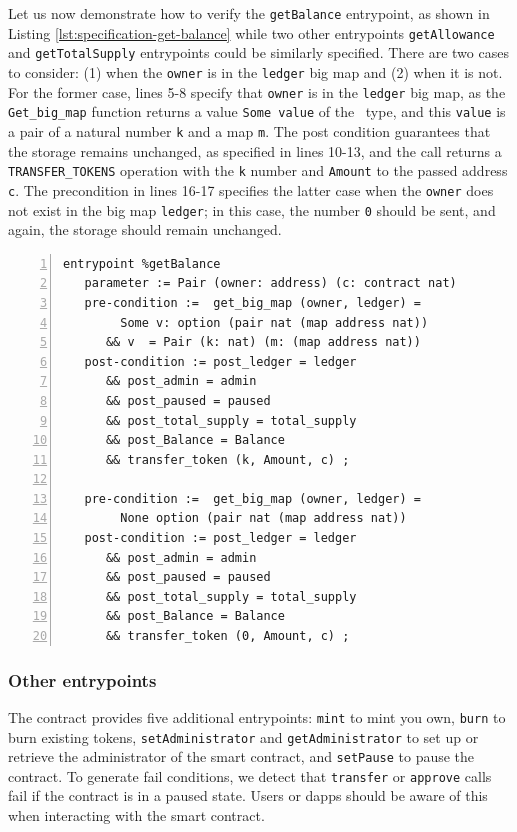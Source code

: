 \documentclass[a4paper,UKenglish,cleveref, autoref, thm-restate]{lipics-v2021}
\begin{document}
Let us now demonstrate how to verify the \lstinline/getBalance/ entrypoint, as shown in Listing \ref{lst:specification-get-balance} while two other entrypoints \lstinline/getAllowance/ and \lstinline/getTotalSupply/ entrypoints could be similarly specified. There are two cases to consider: (1) when the \lstinline/owner/ is in the \lstinline/ledger/ big map and (2) when it is not. For the former case, lines 5-8 specify that \lstinline/owner/ is in the \lstinline/ledger/ big map, as the \lstinline/Get_big_map/ function returns a value \lstinline/Some value/ of the \TOPTION\ type, and this \lstinline/value/ is a pair of a natural number \lstinline/k/ and a map \lstinline/m/. The post condition guarantees that the storage remains unchanged, as specified in lines 10-13, and the call returns a \lstinline/TRANSFER_TOKENS/ operation with the \lstinline/k/ number and \lstinline/Amount/ to the passed address \lstinline/c/. The precondition in lines 16-17 specifies the latter case when the \lstinline/owner/ does not exist in the big map \lstinline/ledger/; in this case, the number \lstinline/0/ should be sent, and again, the storage should remain unchanged.

\begin{lstlisting}[float,captionpos=b,caption={Specification for the \lstinline/getBalance/ entrypoint},label={lst:specification-get-balance},numbers=left]
entrypoint %getBalance
   parameter := Pair (owner: address) (c: contract nat)
   pre-condition :=  get_big_map (owner, ledger) = 
        Some v: option (pair nat (map address nat)) 
      && v  = Pair (k: nat) (m: (map address nat))
   post-condition := post_ledger = ledger 
      && post_admin = admin 
      && post_paused = paused 
      && post_total_supply = total_supply 
      && post_Balance = Balance 
      && transfer_token (k, Amount, c) ;

   pre-condition :=  get_big_map (owner, ledger) = 
        None option (pair nat (map address nat)) 
   post-condition := post_ledger = ledger 
      && post_admin = admin 
      && post_paused = paused 
      && post_total_supply = total_supply 
      && post_Balance = Balance 
      && transfer_token (0, Amount, c) ;
\end{lstlisting}
\subsubsection{Other entrypoints}
The contract provides five additional entrypoints: \lstinline/mint/ to mint you own, \lstinline/burn/ to burn existing tokens, \lstinline/setAdministrator/ and \lstinline/getAdministrator/ to set up or retrieve the administrator of the smart contract, and \lstinline/setPause/ to pause the contract. To generate fail conditions, we detect that \lstinline/transfer/ or \lstinline/approve/ calls fail if the contract is in a paused state. Users or dapps should be aware of this when interacting with the smart contract.
\end{document}
